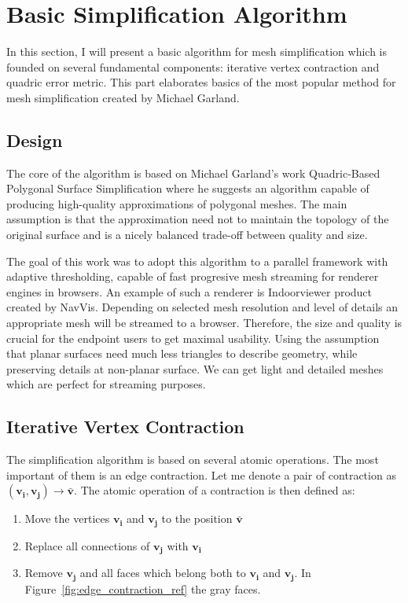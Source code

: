 \chapter{Basic Simplification Algorithm}
\thispagestyle{empty}%
In this section, I will present a basic algorithm for mesh simplification which is founded on several fundamental components: iterative vertex contraction and quadric error metric. This part elaborates basics of the most popular method for mesh simplification created by Michael Garland.
\section{Design}
The core of the algorithm is based on Michael Garland's work Quadric-Based Polygonal Surface Simplification \cite{garland99} where he suggests an algorithm capable of producing high-quality approximations of polygonal meshes. The main assumption is that the approximation need not to maintain the topology of the original surface and is a nicely balanced trade-off between quality and size.

The goal of this work was to adopt this algorithm to a parallel framework with adaptive thresholding, capable of fast progresive mesh streaming \cite{yang01} for renderer engines in browsers. An example of such a renderer is Indoorviewer product created by NavVis. Depending on selected mesh resolution and level of details an appropriate mesh will be streamed to a browser. Therefore, the size and quality is crucial for the endpoint users to get maximal usability. Using the assumption that planar surfaces need much less triangles to describe geometry, while preserving details at non-planar surface. We can get light and detailed meshes which are perfect for streaming purposes.
\clearpage

\section{Iterative Vertex Contraction}
The simplification algorithm is based on several atomic operations. The most important of them is an edge contraction. Let me denote a pair of contraction as $(\mathbf{v_i}, \mathbf{v_j})\rightarrow\bar{\mathbf{v}}$. The atomic operation of a contraction is then defined as:

\begin{enumerate}
\item Move the vertices $\mathbf{v_i}$ and $\mathbf{v_j}$ to the position $\bar{\mathbf{v}}$
\item Replace all connections of $\mathbf{v_j}$ with $\mathbf{v_i}$
\item Remove $\mathbf{v_j}$ and all faces which belong both to $\mathbf{v_i}$ and $\mathbf{v_j}$. In Figure~\ref{fig:edge_contraction_ref} the gray faces.
\end{enumerate}

